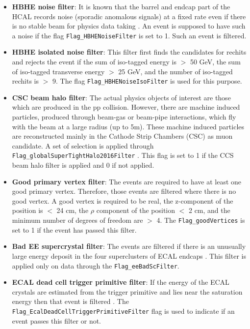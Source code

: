\begin{itemize}
	\item \textbf{HBHE noise filter}: It is known that the barrel and endcap
		part of the HCAL records noise (sporadic anomalous signals) at a
		fixed
		rate even if there is no stable beam for physics data taking
        \cite{metFilters}. An event is supposed to have such a noise if the flag
		\verb|Flag_HBHENoiseFilter| is set to 1. Such an event is filtered.
	\item \textbf{HBHE isolated noise filter}: This filter first finds the
		candidates for rechits and rejects the event if the sum of
		iso-tagged energy is $>$ 50 GeV, the sum of iso-tagged transverse
		energy
		$>$ 25 GeV, and the number of iso-tagged rechits is $>$ 9. The flag
		\verb|Flag_HBHENoiseIsoFilter| is used for this purpose.
 	\item \textbf{CSC beam halo filter}: The actual physics objects of interest
		are those which are produced in the pp collision. However, there
		are machine induced particles, produced through beam-gas or
		beam-pipe interactions, which fly with the beam at a large radius
		(up to 5m). These machine induced particles are reconstructed mainly
		in the Cathode Strip Chambers (CSC) as muon candidate. A set of
		selection is applied through
        \verb|Flag_globalSuperTightHalo2016Filter| \cite{metFilters}. This flag is
		set to 1 if the CCS beam halo filter is applied and 0 if not applied.
	\item \textbf{Good primary vertex filter}: The events are required to have
		at least one good primary vertex. Therefore, those events are
		filtered where there is no good vertex. A good vertex is
		required to be real, the z-component of the position is $ <$ 24 cm,
		the $\rho$ component of the position $<$ 2 cm, and the minimum
		number of degrees of freedom are $>$ 4. The \verb|Flag_goodVertices|
		is set to 1 if the event has passed this filter.
	\item \textbf{Bad EE supercrystal filter}: The events are filtered if
		there is an unusually large energy deposit in the four superclusters
        of ECAL endcaps \cite{metFilters}. This filter is applied only on data
		through the \verb|Flag_eeBadScFilter|.
	\item \textbf{ECAL dead cell trigger primitive filter}: If the energy of
		the ECAL crystals are estimated from the trigger primitive and
		lies near the saturation energy then that event is filtered
        \cite{metFilters}. The \verb|Flag_EcalDeadCellTriggerPrimitiveFilter| flag
		is used to indicate if an event passes this filter or not.

\end{itemize}
